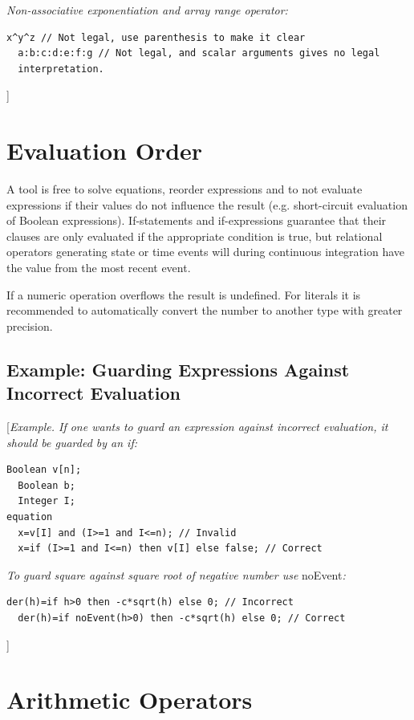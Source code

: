 \documentclass[10pt,a4paper]{report}
\def\doublelabel#1{\label{#1}\hypertarget{#1}{}}
\begin{document}
\emph{Non-associative exponentiation and array range operator:}

\begin{lstlisting}[language=modelica]
  x^y^z // Not legal, use parenthesis to make it clear
  a:b:c:d:e:f:g // Not legal, and scalar arguments gives no legal
  interpretation.
\end{lstlisting}
{]}

\section{Evaluation Order}\doublelabel{evaluation-order}

A tool is free to solve equations, reorder expressions and to not
evaluate expressions if their values do not influence the result (e.g.
short-circuit evaluation of Boolean expressions). If-statements and
if-expressions guarantee that their clauses are only evaluated if the
appropriate condition is true, but relational operators generating state
or time events will during continuous integration have the value from
the most recent event.

If a numeric operation overflows the result is undefined. For literals
it is recommended to automatically convert the number to another type
with greater precision.

\subsection{Example: Guarding Expressions Against Incorrect Evaluation}\doublelabel{example-guarding-expressions-against-incorrect-evaluation}

{[}\emph{Example. If one wants to guard an expression against incorrect
evaluation, it should be guarded by an if:}

\begin{lstlisting}[language=modelica]
  Boolean v[n];
  Boolean b;
  Integer I;
equation
  x=v[I] and (I>=1 and I<=n); // Invalid
  x=if (I>=1 and I<=n) then v[I] else false; // Correct
\end{lstlisting}

\emph{To guard square against square root of negative number use}
noEvent\emph{:}
\begin{lstlisting}[language=modelica]
  der(h)=if h>0 then -c*sqrt(h) else 0; // Incorrect
  der(h)=if noEvent(h>0) then -c*sqrt(h) else 0; // Correct
\end{lstlisting}
{]}

\section{Arithmetic Operators}\doublelabel{arithmetic-operators}
\end{document}

